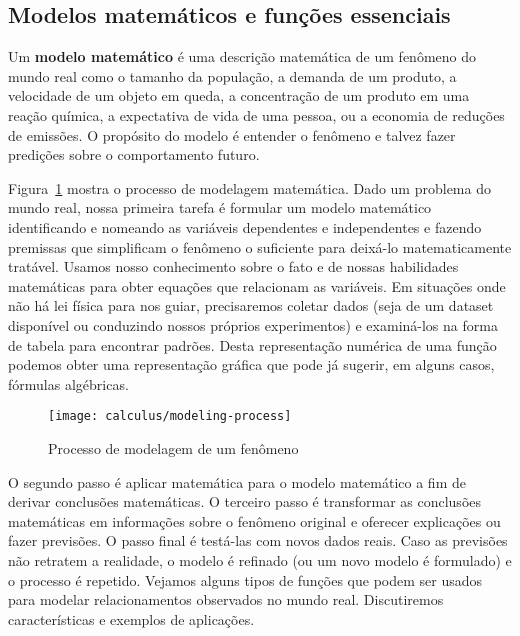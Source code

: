 \subsection{Modelos matemáticos e funções essenciais}

Um \textbf{modelo matemático} é uma descrição matemática de um fenômeno do mundo real como o tamanho da população, a demanda de um produto, a velocidade de um objeto em queda, a concentração de um produto em uma reação química, a expectativa de vida de uma pessoa, ou a economia de reduções de emissões. O propósito do modelo é entender o fenômeno e talvez fazer predições sobre o comportamento futuro.

Figura~\ref{fig:modeling-process} mostra o processo de modelagem matemática. Dado um problema do mundo real, nossa primeira tarefa é formular um modelo matemático identificando e nomeando as variáveis dependentes e independentes e fazendo premissas que simplificam o fenômeno o suficiente para deixá-lo matematicamente tratável. Usamos nosso conhecimento sobre o fato e de nossas habilidades matemáticas para obter equações que relacionam as variáveis. Em situações onde não há lei física para nos guiar, precisaremos coletar dados (seja de um dataset disponível ou conduzindo nossos próprios experimentos) e examiná-los na forma de tabela para encontrar padrões. Desta representação numérica de uma função podemos obter uma representação gráfica que pode já sugerir, em alguns casos, fórmulas algébricas.
\vspace{-0.5cm}\begin{figure}[!ht]
  \centering
  \texttt{[image: calculus/modeling-process]}
  \caption{Processo de modelagem de um fenômeno}
  \label{fig:modeling-process}
  \vspace{-0.5cm}
\end{figure}

O segundo passo é aplicar matemática para o modelo matemático a fim de derivar conclusões matemáticas. O terceiro passo é transformar as conclusões matemáticas em informações sobre o fenômeno original e oferecer explicações ou fazer previsões. O passo final é testá-las com novos dados reais. Caso as previsões não retratem a realidade, o modelo é refinado (ou um novo modelo é formulado) e o processo é repetido. Vejamos alguns tipos de funções que podem ser usados para modelar relacionamentos observados no mundo real. Discutiremos características e exemplos de aplicações.\vspace{-0.3cm}

